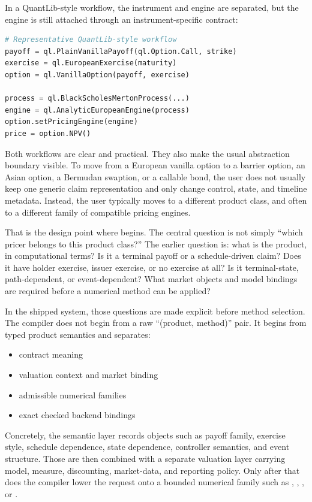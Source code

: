 \documentclass[11pt]{article}
\begin{document}
In a QuantLib-style workflow, the instrument and engine are separated, but the
engine is still attached through an instrument-specific contract:

\begin{lstlisting}[language=Python]
# Representative QuantLib-style workflow
payoff = ql.PlainVanillaPayoff(ql.Option.Call, strike)
exercise = ql.EuropeanExercise(maturity)
option = ql.VanillaOption(payoff, exercise)

process = ql.BlackScholesMertonProcess(...)
engine = ql.AnalyticEuropeanEngine(process)
option.setPricingEngine(engine)
price = option.NPV()
\end{lstlisting}

Both workflows are clear and practical. They also make the usual abstraction
boundary visible. To move from a European vanilla option to a barrier option,
an Asian option, a Bermudan swaption, or a callable bond, the user does not
usually keep one generic claim representation and only change control, state,
and timeline metadata. Instead, the user typically moves to a different
product class, and often to a different family of compatible pricing engines.

That is the design point where \trellis{} begins. The central question is not
simply ``which pricer belongs to this product class?'' The earlier question is:
what is the product, in computational terms? Is it a terminal payoff or a
schedule-driven claim? Does it have holder exercise, issuer exercise, or no
exercise at all? Is it terminal-state, path-dependent, or event-dependent? What
market objects and model bindings are required before a numerical method can be
applied?

In the shipped system, those questions are made explicit before method
selection. The compiler does not begin from a raw ``(product, method)'' pair.
It begins from typed product semantics and separates:
\begin{itemize}
    \item contract meaning
    \item valuation context and market binding
    \item admissible numerical families
    \item exact checked backend bindings
\end{itemize}

Concretely, the semantic layer records objects such as payoff family,
exercise style, schedule dependence, state dependence, controller semantics,
and event structure. Those are then combined with a separate valuation layer
carrying model, measure, discounting, market-data, and reporting policy. Only
after that does the compiler lower the request onto a bounded numerical family
such as , ,
, or .
\end{document}
